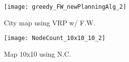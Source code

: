 \begin{figure}[h] 
  \label{fig:finalPaths} 
  \begin{minipage}[b]{0.55\linewidth}
    \centering
    \texttt{[image: greedy\_FW\_newPlanningAlg\_2]}
    \caption{City map using VRP w/ F.W.}
    \label{fig:cityMap_VRP_sim}
    \vspace{1ex}
  \end{minipage}
  \begin{minipage}[b]{0.5\linewidth}
    \centering
    \texttt{[image: NodeCount\_10x10\_10\_2]}
    \caption{Map 10x10 using N.C.}
    \label{fig:10x10_NC_sim}
    \vspace{1ex}%
  \end{minipage}
\end{figure}